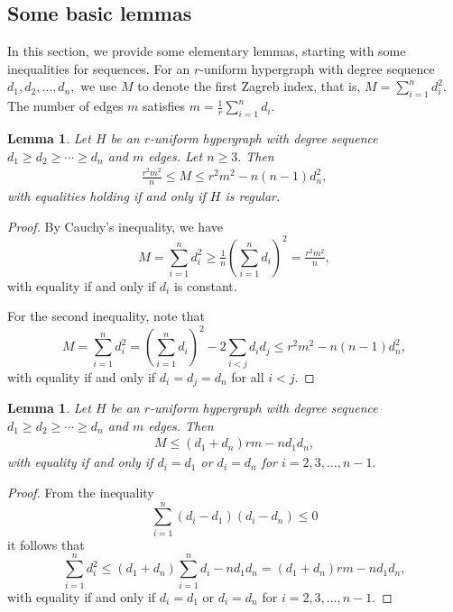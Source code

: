 \documentclass[11pt]{article}
\newtheorem{lemma}[theorem]{Lemma}
\begin{document}
\subsection{Some basic lemmas}

In this section, we provide some elementary lemmas, starting with some inequalities for sequences.
For an $r$-uniform hypergraph with degree sequence $d_{1}, d_{2}, \ldots, d_{n},$ we use $M$ to denote the first Zagreb index, that is, $M=\sum\limits_{i=1}^{n}d_{i}^{2}.$ The number of edges $m$ satisfies $m=\frac{1}{r}\sum\limits_{i=1}^{n}d_{i}$.

\noindent\begin{lemma}\label{le:2-1}
Let $H$ be an $r$-uniform hypergraph with degree sequence $d_{1}\geq d_{2}\geq \cdots\geq d_{n}$ and $m$ edges. Let $n\geq 3.$ Then
\begin{align*}
\tfrac{r^{2}m^{2}}{n} \leq M\leq r^{2}m^{2}-n(n-1)d_{n}^{2},
\end{align*}
with equalities holding if and only if $H$ is regular.
\end{lemma}

\begin{proof}
By Cauchy's inequality, we have $$M=\sum_{i=1}^{n}d_{i}^{2}\geq \tfrac{1}{n}(\sum\limits_{i=1}^{n}d_{i})^{2}=\tfrac{r^{2}m^{2}}{n},$$ with equality if and only if $d_{i}$ is constant.

For the second inequality, note that
$$M=\sum_{i=1}^{n}d_{i}^{2}=(\sum_{i=1}^{n}d_{i})^{2}-2\sum\limits_{i<j}d_{i}d_{j}\leq r^{2}m^{2}-n(n-1)d_{n}^{2},$$
with equality if and only if $d_{i}=d_j=d_n$ for all $i<j$.
\end{proof}

\noindent\begin{lemma}\label{le:2-2}
Let $H$ be an $r$-uniform hypergraph with degree sequence $d_{1}\geq d_{2}\geq \cdots\geq d_{n}$ and $m$ edges. Then
\begin{align*}
M\leq (d_{1}+d_{n})rm-nd_{1}d_{n},
\end{align*}
with equality if and only if $d_{i}=d_{1}$ or $d_{i}=d_{n}$ for $i=2,3, \ldots,n-1.$
\end{lemma}

\begin{proof}  From the inequality $$\sum_{i=1}^{n}(d_{i}-d_{1})(d_{i}-d_{n})\leq 0$$
it follows that $$\sum_{i=1}^{n}d_{i}^{2}\leq (d_{1}+d_{n})\sum_{i=1}^{n}d_{i}-nd_{1}d_{n}=(d_{1}+d_{n})rm-nd_{1}d_{n},$$
with equality if and only if $d_{i}=d_{1}$ or $d_{i}=d_{n}$ for $i=2,3, \ldots,n-1.$
\end{proof}
\end{document}
